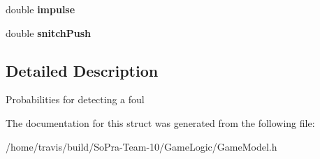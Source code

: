 \begin{DoxyCompactItemize}
\item 
\hypertarget{structgame_model_1_1_foul_detection_probs_a5bfd5f10ad171bf423a37776f0c2e7ed}{double {\bfseries impulse}}\label{structgame_model_1_1_foul_detection_probs_a5bfd5f10ad171bf423a37776f0c2e7ed}

\item 
\hypertarget{structgame_model_1_1_foul_detection_probs_ae3103298aff06049e468bc27d3946f3a}{double {\bfseries snitch\-Push}}\label{structgame_model_1_1_foul_detection_probs_ae3103298aff06049e468bc27d3946f3a}

\end{DoxyCompactItemize}


\subsection{Detailed Description}
Probabilities for detecting a foul 

The documentation for this struct was generated from the following file\-:\begin{DoxyCompactItemize}
\item 
/home/travis/build/\-So\-Pra-\/\-Team-\/10/\-Game\-Logic/Game\-Model.\-h\end{DoxyCompactItemize}
